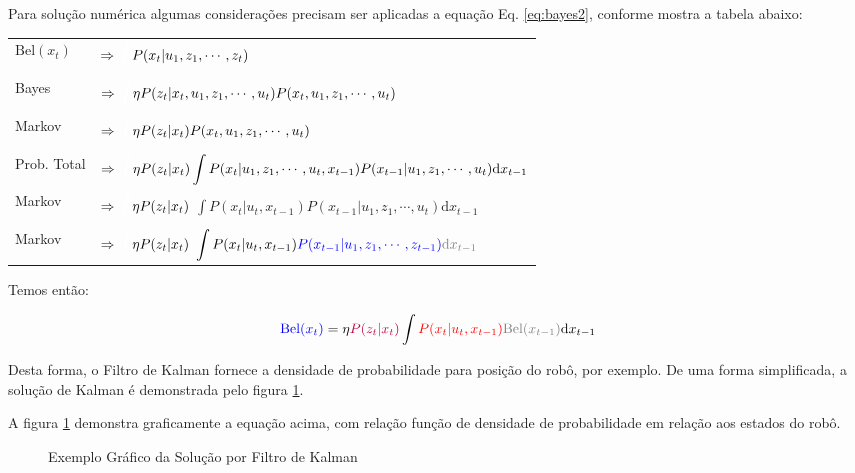 Para solução numérica algumas considerações precisam ser aplicadas a equação Eq. \ref{eq:bayes2}, conforme mostra a tabela abaixo:

\begin{tabular}{l l}
    ${\text{Bel}}(x_t)$ & $\Rightarrow\textcolor{white}{\displaystyle\int} P(x_t| u_1, z_1,  \cdots, z_t)$ \\
    Bayes & $\Rightarrow\textcolor{white}{\displaystyle\int} \eta P(z_t|x_t,  u_1, z_1,  \cdots,  u_t)P(x_t, u_1, z_1, \cdots, u_t)$ \\
    Markov & $\Rightarrow\textcolor{white}{\displaystyle\int} \eta P(z_t|x_t)P(x_t, u_1, z_1, \cdots, u_t)$ \\
    Prob. Total & $\Rightarrow\textcolor{white}{\displaystyle\int} \eta P(z_t|x_t)\displaystyle\int P(x_t| u_1, z_1, \cdots, u_t,x_{t-1})P(x_{t-1}| u_1, z_1, \cdots, u_t)\text{d}x_{t-1}$\\
    Markov & $\Rightarrow\textcolor{white}{\displaystyle\int} \eta P(z_t|x_t)$ $\displaystyle\int P(x_t| u_t,x_{t-1})P(x_{t-1}| u_1, z_1, \cdots, u_t)\text{d}x_{t-1}$ \\
    Markov & $\Rightarrow\textcolor{white}{\displaystyle\int} \eta P(z_t|x_t)$ $\displaystyle\int P(x_t| u_t,x_{t-1})\color{blue}{P(x_{t-1}| u_1, z_1, \cdots, z_{t-1}})\color{gray}{\text{d}x_{t-1}}$ \\
\end{tabular}   

Temos então:

\begin{equation*}
    \textcolor{blue}{\text{Bel}(x_t)} =\eta \textcolor{purple}{P(z_t|x_t)}\displaystyle\int \textcolor{red}{P(x_t| u_t,x_{t-1})}\textcolor{gray}{\text{Bel}(x_{t-1})}\text{d}x_{t-1}
\end{equation*}


Desta forma, o Filtro de Kalman fornece a densidade de probabilidade para posição do robô, por exemplo. De uma forma simplificada, a solução de Kalman é demonstrada pelo figura \ref{fig::kalm1}.

A figura \ref{fig::kalm1} demonstra graficamente a equação acima, com relação função de densidade de probabilidade em relação aos estados do robô.
    
\begin{figure}[!ht]
    \centering
    
    \caption{Exemplo Gráfico da Solução por Filtro de Kalman}
    \label{fig::kalm1}
\end{figure}

